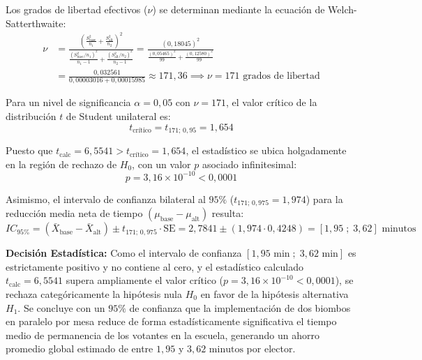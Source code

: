 \documentclass[11pt,a4paper]{article}
\begin{document}
Los grados de libertad efectivos ($\nu$) se determinan mediante la ecuación de Welch-Satterthwaite:
\begin{equation}
\begin{aligned}
    \nu &= \frac{\left( \frac{S_{\text{base}}^2}{n_1} + \frac{S_{\text{alt}}^2}{n_2} \right)^2}{\frac{(S_{\text{base}}^2 / n_1)^2}{n_1 - 1} + \frac{(S_{\text{alt}}^2 / n_2)^2}{n_2 - 1}} = \frac{(0{,}18045)^2}{\frac{(0{,}05465)^2}{99} + \frac{(0{,}12580)^2}{99}} \\[6pt]
    &= \frac{0{,}032561}{0{,}00003016 + 0{,}00015985} \approx 171{,}36 \implies \nu = 171\text{ grados de libertad}
\end{aligned}
\end{equation}

Para un nivel de significancia $\alpha = 0{,}05$ con $\nu = 171$, el valor crítico de la distribución $t$ de Student unilateral es:
\begin{equation}
    t_{\text{crítico}} = t_{171; \, 0{,}95} = 1{,}654
\end{equation}

Puesto que $t_{\text{calc}} = 6{,}5541 > t_{\text{crítico}} = 1{,}654$, el estadístico se ubica holgadamente en la región de rechazo de $H_0$, con un valor $p$ asociado infinitesimal:
\begin{equation}
    p = 3{,}16 \times 10^{-10} < 0{,}0001
\end{equation}

Asimismo, el intervalo de confianza bilateral al $95\%$ ($t_{171; \, 0{,}975} = 1{,}974$) para la reducción media neta de tiempo $(\mu_{\text{base}} - \mu_{\text{alt}})$ resulta:
\begin{equation}
    IC_{95\%} = (\bar{X}_{\text{base}} - \bar{X}_{\text{alt}}) \pm t_{171; \, 0{,}975} \cdot \text{SE} = 2{,}7841 \pm (1{,}974 \cdot 0{,}4248) = [1{,}95 \;;\; 3{,}62]\text{ minutos}
\end{equation}

\noindent \textbf{Decisión Estadística:} Como el intervalo de confianza $[1{,}95\text{ min} \;;\; 3{,}62\text{ min}]$ es estrictamente positivo y no contiene al cero, y el estadístico calculado $t_{\text{calc}} = 6{,}5541$ supera ampliamente el valor crítico ($p = 3{,}16 \times 10^{-10} < 0{,}0001$), se rechaza categóricamente la hipótesis nula $H_0$ en favor de la hipótesis alternativa $H_1$. Se concluye con un $95\%$ de confianza que la implementación de dos biombos en paralelo por mesa reduce de forma estadísticamente significativa el tiempo medio de permanencia de los votantes en la escuela, generando un ahorro promedio global estimado de entre $1{,}95$ y $3{,}62\text{ minutos}$ por elector.
\end{document}
